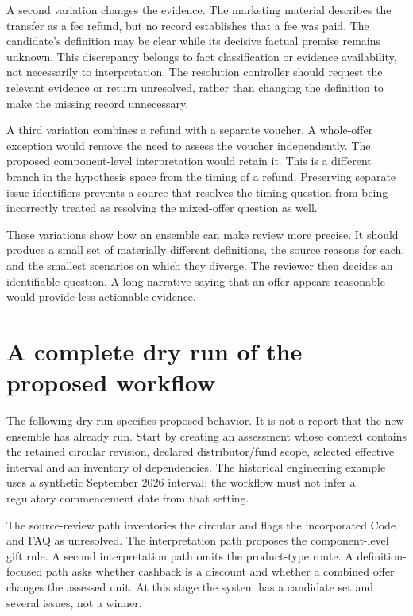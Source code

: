 A second variation changes the evidence. The marketing material describes the
transfer as a fee refund, but no record establishes that a fee was paid. The
candidate's definition may be clear while its decisive factual premise remains
unknown. This discrepancy belongs to fact classification or evidence
availability, not necessarily to interpretation. The resolution controller
should request the relevant evidence or return unresolved, rather than
changing the definition to make the missing record unnecessary.

A third variation combines a refund with a separate voucher. A whole-offer
exception would remove the need to assess the voucher independently. The
proposed component-level interpretation would retain it. This is a different
branch in the hypothesis space from the timing of a refund. Preserving separate
issue identifiers prevents a source that resolves the timing question from
being incorrectly treated as resolving the mixed-offer question as well.

These variations show how an ensemble can make review more precise. It should
produce a small set of materially different definitions, the source reasons
for each, and the smallest scenarios on which they diverge. The reviewer then
decides an identifiable question. A long narrative saying that an offer appears
reasonable would provide less actionable evidence.

\section{A complete dry run of the proposed workflow}
\label{merge:M02:07}

\label{sec:circular-dryrun}
The following dry run specifies proposed behavior. It is not a report that the
new ensemble has already run. Start by creating an assessment whose context
contains the retained circular revision, declared distributor/fund scope,
selected effective interval and an inventory of dependencies. The historical
engineering example uses a synthetic September 2026 interval; the workflow must
not infer a regulatory commencement date from that setting.

The source-review path inventories the circular and flags the incorporated Code
and FAQ as unresolved. The interpretation path proposes the component-level
gift rule. A second interpretation path omits the product-type route. A
definition-focused path asks whether cashback is a discount and whether a
combined offer changes the assessed unit. At this stage the system has a
candidate set and several issues, not a winner.

